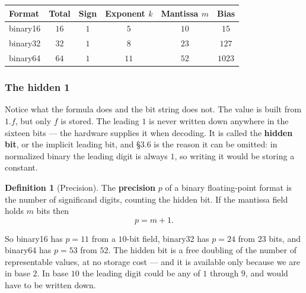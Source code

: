 \documentclass[11pt]{article}
\theoremstyle{plain}
\theoremstyle{definition}
\newtheorem{defn}{Definition}[section]
\theoremstyle{remark}
\begin{document}
\begin{center}
\renewcommand{\arraystretch}{1.3}
\begin{tabular}{@{}l c c c c c@{}}
\toprule
\textbf{Format} & \textbf{Total} & \textbf{Sign} & \textbf{Exponent $k$}
                & \textbf{Mantissa $m$} & \textbf{Bias} \\
\midrule
binary16 & $16$ & $1$ & $5$  & $10$ & $15$ \\
binary32 & $32$ & $1$ & $8$  & $23$ & $127$ \\
binary64 & $64$ & $1$ & $11$ & $52$ & $1023$ \\
\bottomrule
\end{tabular}
\end{center}

\subsubsection*{The hidden 1}
Notice what the formula does and the bit string does not. The value is built
from $1.f$, but only $f$ is stored. The leading $1$ is never written down
anywhere in the sixteen bits --- the hardware supplies it when decoding. It is
called the \textbf{hidden bit}, or the implicit leading bit, and \S3.6 is the
reason it can be omitted: in normalized binary the leading digit is always $1$,
so writing it would be storing a constant.

\begin{defn}[Precision]
The \textbf{precision} $p$ of a binary floating-point format is the number of
significand digits, counting the hidden bit. If the mantissa field holds $m$
bits then
\[
  p = m+1 .
\]
\end{defn}

\noindent So binary16 has $p=11$ from a $10$-bit field, binary32 has $p=24$ from
$23$ bits, and binary64 has $p=53$ from $52$. The hidden bit is a free doubling
of the number of representable values, at no storage cost --- and it is
available only because we are in base $2$. In base $10$ the leading digit could
be any of $1$ through $9$, and would have to be written down.
\end{document}
